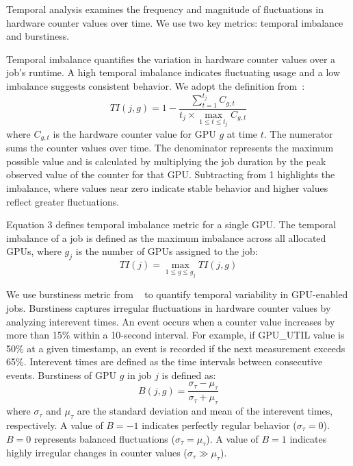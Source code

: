 Temporal analysis examines the frequency and magnitude of fluctuations in
hardware counter values over time.  We use two key metrics: temporal imbalance
and burstiness.

\vspace{0.08in}
Temporal imbalance quantifies the variation in hardware counter values over a job's
runtime. A high temporal imbalance indicates fluctuating usage and
a low imbalance suggests consistent behavior. We adopt the definition
from~\cite{peng2021holistic}:
%
\begin{equation}
    \mathit{TI}(j, g) = 1 - \frac{\sum_{t=1}^{t_j} C_{g,t}}{t_j \times \max_{1 \le t \le t_j} C_{g,t}}
\end{equation}
%
where $ C_{g,t} $ is the hardware counter value for GPU $g$ at time $t$. The numerator
sums the counter values over time. The denominator represents the maximum
possible value and is calculated by
multiplying the job duration by the peak observed value of the counter for that GPU.
Subtracting from 1 highlights the imbalance, where values near zero
indicate stable behavior and higher values reflect greater
fluctuations.

Equation 3 defines temporal imbalance metric for a single GPU.
The temporal imbalance of a job is defined as the maximum imbalance across
all allocated GPUs, where $g_j$ is the number of GPUs assigned to the job:
%
\[
    \mathit{TI}(j) = \max_{1 \le g \le g_j}TI(j, g)
\]

\vspace{0.08in}
We use burstiness metric from ~\cite{goh2008burstiness} to quantify temporal
variability in GPU-enabled jobs. Burstiness captures
irregular fluctuations in hardware counter values by analyzing interevent times.
An event occurs when a counter value increases by more than 15\% within a 10-second
interval. For example, if GPU\_UTIL value is 50\% at a given timestamp, an event is
recorded if the next measurement exceeds 65\%. Interevent times are defined
as the time intervals between consecutive events. Burstiness of
GPU $g$ in job $j$ is defined as:
%
\begin{equation}
    \mathit{B}(j, g) = \frac{\sigma_\tau-\mu_\tau}{\sigma_\tau+\mu_\tau}
\end{equation}
%
where $\sigma_\tau$ and $\mu_\tau$ are the standard deviation and
mean of the interevent times, respectively. A value of $B=-1$ indicates perfectly
regular behavior ($\sigma_\tau=0$). $\mathit{B}=0$ represents
balanced fluctuations ($\sigma_\tau=\mu_\tau$).  A value of $B=1$ indicates
highly irregular changes in counter values ($\sigma_\tau\gg\mu_\tau$).

